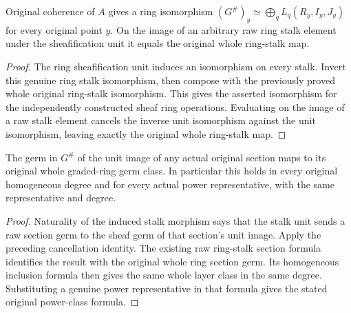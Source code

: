 \begin{theorem}
\label{hir:real-domain-actual-normal-associated-ring-sheaf-whole-stalk-equivalence}
\leanok
Original coherence of $A$ gives a ring isomorphism
$(G^{\#})_y\simeq\bigoplus_q L_q(R_y,I_y,J_y)$ for every original point
$y$. On the image of an arbitrary raw ring stalk element under the
sheafification unit it equals the original whole ring-stalk map.
\end{theorem}
\begin{proof}
The ring sheafification unit induces an isomorphism on every stalk.
Invert this genuine ring stalk isomorphism, then compose with the
previously proved whole original ring-stalk isomorphism. This gives
the asserted isomorphism for the independently constructed sheaf
ring operations. Evaluating on the image of a raw stalk element
cancels the inverse unit isomorphism against the unit isomorphism,
leaving exactly the original whole ring-stalk map.
\end{proof}

\begin{lemma}
\label{hir:real-domain-actual-normal-associated-ring-sheaf-original-germs}
\leanok
The germ in $G^{\#}$ of the unit image of any actual original section
maps to its original whole graded-ring germ class. In particular this
holds in every original homogeneous degree and for every actual power
representative, with the same representative and degree.
\end{lemma}
\begin{proof}
Naturality of the induced stalk morphism says that the stalk unit sends
a raw section germ to the sheaf germ of that section's unit image.
Apply the preceding cancellation identity. The existing raw ring-stalk
section formula identifies the result with the original whole ring
section germ. Its homogeneous inclusion formula then gives the same
whole layer class in the same degree. Substituting a genuine power
representative in that formula gives the stated original power-class
formula.
\end{proof}
